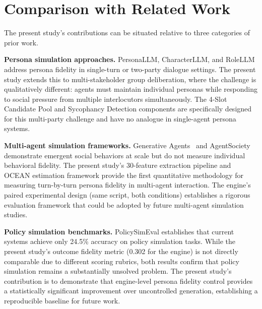 \section{Comparison with Related Work}

The present study's contributions can be situated relative to three categories of prior work.

\textbf{Persona simulation approaches.} PersonaLLM, CharacterLLM, and RoleLLM address persona fidelity in single-turn or two-party dialogue settings. The present study extends this to multi-stakeholder group deliberation, where the challenge is qualitatively different: agents must maintain individual personas while responding to social pressure from multiple interlocutors simultaneously. The 4-Slot Candidate Pool and Sycophancy Detection components are specifically designed for this multi-party challenge and have no analogue in single-agent persona systems.

\textbf{Multi-agent simulation frameworks.} Generative Agents~\cite{park2023generative} and AgentSociety demonstrate emergent social behaviors at scale but do not measure individual behavioral fidelity. The present study's 30-feature extraction pipeline and OCEAN estimation framework provide the first quantitative methodology for measuring turn-by-turn persona fidelity in multi-agent interaction. The engine's paired experimental design (same script, both conditions) establishes a rigorous evaluation framework that could be adopted by future multi-agent simulation studies.

\textbf{Policy simulation benchmarks.} PolicySimEval establishes that current systems achieve only 24.5\% accuracy on policy simulation tasks. While the present study's outcome fidelity metric (0.302 for the engine) is not directly comparable due to different scoring rubrics, both results confirm that policy simulation remains a substantially unsolved problem. The present study's contribution is to demonstrate that engine-level persona fidelity control provides a statistically significant improvement over uncontrolled generation, establishing a reproducible baseline for future work.
